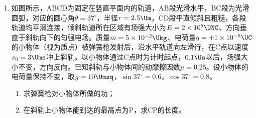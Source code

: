 \documentclass[\gkver]{gaokaozhenti}
\begin{document}
\begin{enumerate}
{(2)设蓄水总质量为$M$，所用抽水时间为$t$。已知抽水高度为$h$，容积为$V$，水的密度为$\rho$，则$M=\rho V$；设质量为$M$的河水增加的重力势能为$\Delta E_{p}$，则$\Delta E_{p}=Mgh$；设电动机的输出功率为$P_{0}$，则$P_{0}=P-P_{r}$；根据能量守恒定律得$P_{0}t\times60\%\times80\%=\Delta E_{p}$，代入数据解得$t=2\times10^{4}\Us$。
}

\item
如图所示，ABCD为固定在竖直平面内的轨道，AB段光滑水平，BC段为光滑圆弧，对应的圆心角$\theta=37^\circ$，半径$r=2.5\Um$，CD段平直倾斜且粗糙，各段轨道均平滑连接，倾斜轨道所在区域有场强大小为$E=2\times10^{5}\UNC$、方向垂直于斜轨向下的匀强电场。质量$m=5\times10^{-2}\Ukg$、电荷量$q=+1\times10^{-6}\UC$的小物体（视为质点）被弹簧枪发射后，沿水平轨道向左滑行，在C点以速度$v_{0}=3\Ums$冲上斜轨。以小物体通过C点时为计时起点，$0.1\Us$以后，场强大小不变，方向反向。已知斜轨与小物体间的动摩擦因数$\mu=0.25$。设小物体的电荷量保持不变，取$g=10\Umsq$，$\sin37^\circ=0.6$，$\cos37^\circ=0.8$。
\begin{enumerate}
	\item
	求弹簧枪对小物体所做的功；
	\item
	在斜轨上小物体能到达的最高点为P，求CP的长度。
\end{enumerate}
\jdanswer{
\begin{enumerate}
	\item
	$0.475\UJ$
	\item
	$0.57\Um$
\end{enumerate}
}


\end{enumerate}
\end{document}
